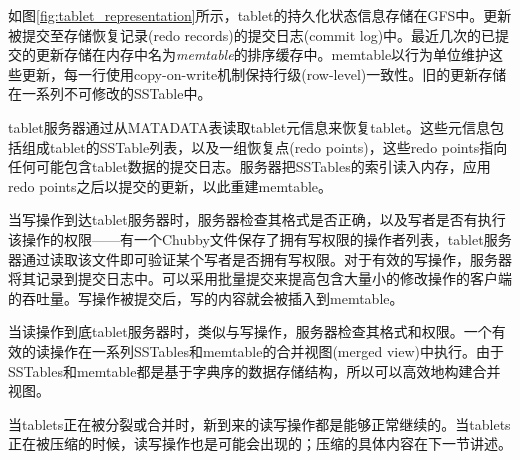 \documentclass{article}
\begin{document}
如图\ref{fig:tablet_representation}所示，tablet的持久化状态信息存储在GFS中。更新被提交至存储恢复记录(redo records)的提交日志(commit log)中。最近几次的已提交的更新存储在内存中名为\emph{memtable}的排序缓存中。memtable以行为单位维护这些更新，每一行使用copy-on-write机制保持行级(row-level)一致性。旧的更新存储在一系列不可修改的SSTable中。\par
tablet服务器通过从MATADATA表读取tablet元信息来恢复tablet。这些元信息包括组成tablet的SSTable列表，以及一组恢复点(redo points)，这些redo points指向任何可能包含tablet数据的提交日志。服务器把SSTables的索引读入内存，应用redo points之后以提交的更新，以此重建memtable。\par
当写操作到达tablet服务器时，服务器检查其格式是否正确，以及写者是否有执行该操作的权限——有一个Chubby文件保存了拥有写权限的操作者列表，tablet服务器通过读取该文件即可验证某个写者是否拥有写权限。对于有效的写操作，服务器将其记录到提交日志中。可以采用批量提交来提高包含大量小的修改操作的客户端的吞吐量。写操作被提交后，写的内容就会被插入到memtable。\par
当读操作到底tablet服务器时，类似与写操作，服务器检查其格式和权限。一个有效的读操作在一系列SSTables和memtable的合并视图(merged view)中执行。由于SSTables和memtable都是基于字典序的数据存储结构，所以可以高效地构建合并视图。\par
当tablets正在被分裂或合并时，新到来的读写操作都是能够正常继续的。当tablets正在被压缩的时候，读写操作也是可能会出现的；压缩的具体内容在下一节讲述。
\end{document}
